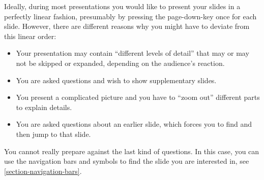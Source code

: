 Ideally, during most presentations you would like to present your
slides in a perfectly linear fashion, presumably by pressing the
page-down-key once for each slide. However, there are different
reasons why you might have to deviate from this linear order:
\begin{itemize}
\item
  Your presentation may contain ``different levels of detail'' that
  may or may not be skipped or expanded, depending on the audience's
  reaction.
\item
  You are asked questions and wish to show supplementary slides.
\item
  You present a complicated picture and you have to ``zoom out''
  different parts to explain details.
\item
  You are asked questions about an earlier slide, which forces you to 
  find and then jump to that slide.
\end{itemize}
You cannot really prepare against the last kind of questions. In this
case, you can use the navigation bars and symbols to find the slide
you are interested in, see \ref{section-navigation-bars}.

